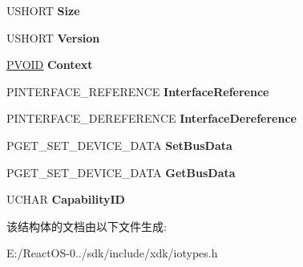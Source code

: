 \begin{DoxyCompactItemize}
\item 
\mbox{\label{struct___a_g_p___t_a_r_g_e_t___b_u_s___i_n_t_e_r_f_a_c_e___s_t_a_n_d_a_r_d_adaa40ae750164bf4adeccf894f92aa98}} 
U\+S\+H\+O\+RT {\bfseries Size}
\item 
\mbox{\label{struct___a_g_p___t_a_r_g_e_t___b_u_s___i_n_t_e_r_f_a_c_e___s_t_a_n_d_a_r_d_a4c24eba4de664ab2c941ffbfec0e9de4}} 
U\+S\+H\+O\+RT {\bfseries Version}
\item 
\mbox{\label{struct___a_g_p___t_a_r_g_e_t___b_u_s___i_n_t_e_r_f_a_c_e___s_t_a_n_d_a_r_d_aae9ccf4daa146259c2b801aef344de90}} 
\hyperlink{interfacevoid}{P\+V\+O\+ID} {\bfseries Context}
\item 
\mbox{\label{struct___a_g_p___t_a_r_g_e_t___b_u_s___i_n_t_e_r_f_a_c_e___s_t_a_n_d_a_r_d_a0755f25f9415bd838d2a289e014872fe}} 
P\+I\+N\+T\+E\+R\+F\+A\+C\+E\+\_\+\+R\+E\+F\+E\+R\+E\+N\+CE {\bfseries Interface\+Reference}
\item 
\mbox{\label{struct___a_g_p___t_a_r_g_e_t___b_u_s___i_n_t_e_r_f_a_c_e___s_t_a_n_d_a_r_d_a9b6d25a37a2dd2a12c0e4cbd3de64fc9}} 
P\+I\+N\+T\+E\+R\+F\+A\+C\+E\+\_\+\+D\+E\+R\+E\+F\+E\+R\+E\+N\+CE {\bfseries Interface\+Dereference}
\item 
\mbox{\label{struct___a_g_p___t_a_r_g_e_t___b_u_s___i_n_t_e_r_f_a_c_e___s_t_a_n_d_a_r_d_acdaa9fc082c852a69928aeb5276dd0d8}} 
P\+G\+E\+T\+\_\+\+S\+E\+T\+\_\+\+D\+E\+V\+I\+C\+E\+\_\+\+D\+A\+TA {\bfseries Set\+Bus\+Data}
\item 
\mbox{\label{struct___a_g_p___t_a_r_g_e_t___b_u_s___i_n_t_e_r_f_a_c_e___s_t_a_n_d_a_r_d_a979f3c6e7dfec2862c5ca9fbe6e01eff}} 
P\+G\+E\+T\+\_\+\+S\+E\+T\+\_\+\+D\+E\+V\+I\+C\+E\+\_\+\+D\+A\+TA {\bfseries Get\+Bus\+Data}
\item 
\mbox{\label{struct___a_g_p___t_a_r_g_e_t___b_u_s___i_n_t_e_r_f_a_c_e___s_t_a_n_d_a_r_d_ab89aad378aadeb0b6022babf79a98e91}} 
U\+C\+H\+AR {\bfseries Capability\+ID}
\end{DoxyCompactItemize}


该结构体的文档由以下文件生成\+:\begin{DoxyCompactItemize}
\item 
E\+:/\+React\+O\+S-\/0../sdk/include/xdk/iotypes.\+h\end{DoxyCompactItemize}
